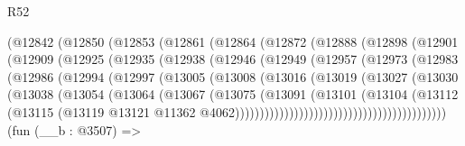 \begin{lexlean}{R52}
\begin{coremodule}
              (@12842
                (@12850
                  (@12853
                    (@12861
                      (@12864
                        (@12872
                          (@12888
                            (@12898
                              (@12901
                                (@12909
                                  (@12925
                                    (@12935
                                      (@12938
                                        (@12946
                                          (@12949
                                            (@12957
                                              (@12973
                                                (@12983
                                                  (@12986
                                                    (@12994
                                                      (@12997
                                                        (@13005
                                                          (@13008
                                                            (@13016
                                                              (@13019
                                                                (@13027
                                                                  (@13030
                                                                    (@13038
                                                                      (@13054
                                                                        (@13064
                                                                          (@13067
                                                                            (@13075
                                                                              (@13091
                                                                                (@13101
                                                                                  (@13104
                                                                                    (@13112
                                                                                      (@13115
                                                                                        (@13119
                                                                                          @13121
                                                                                          @11362
                                                                                          @4062)))))))))))))))))))))))))))))))))))))))))))
    (fun (__b : @3507) =>

\end{coremodule}
\end{lexlean}
